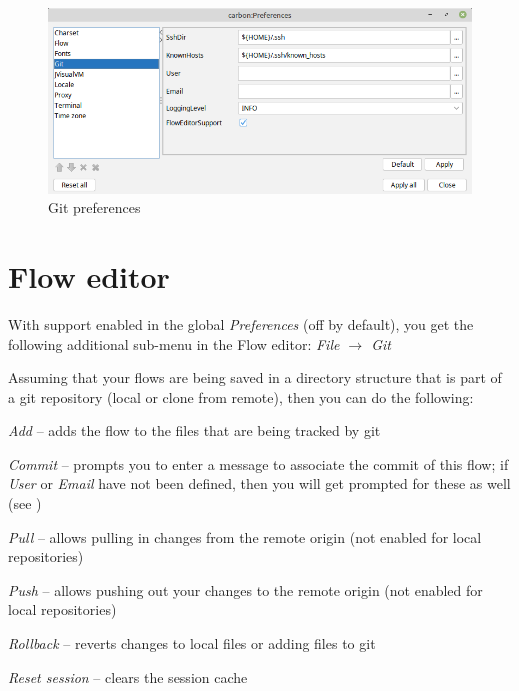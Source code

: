 \documentclass[a4paper]{book}
\begin{document}
\begin{figure}[htb]
  \centering
  \includegraphics[width=12.0cm]{images/preferences.png}
  \caption{Git preferences}
  \label{preferences}
\end{figure}


\section{Flow editor}
With support enabled in the global \textit{Preferences} (off by default), you get the following
additional sub-menu in the Flow editor: \textit{File $\rightarrow$ Git}

Assuming that your flows are being saved in a directory structure that is part of a git
repository (local or clone from remote), then you can do the following:
\begin{tight_itemize}
    \item \textit{Add} -- adds the flow to the files that are being tracked by git
    \item \textit{Commit} -- prompts you to enter a message to associate the commit of this flow;
    if \textit{User} or \textit{Email} have not been defined, then you will get prompted
    for these as well (see \cite{git-config})
    \item \textit{Pull} -- allows pulling in changes from the remote origin (not enabled for local repositories)
    \item \textit{Push} -- allows pushing out your changes to the remote origin (not enabled for local repositories)
    \item \textit{Rollback} -- reverts changes to local files or adding files to git
    \item \textit{Reset session} -- clears the session cache
\end{tight_itemize}



\end{document}

